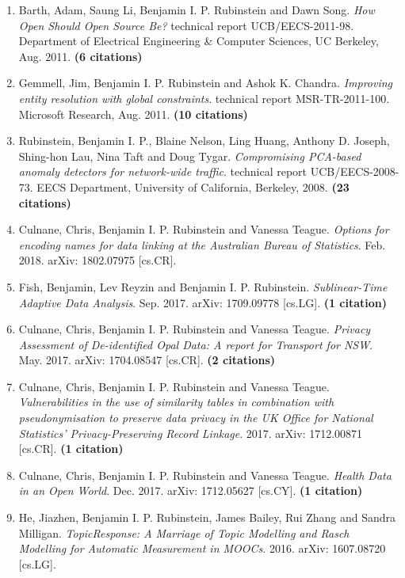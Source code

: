 \documentclass[a4paper,12pt]{article}
\begin{document}
\begin{enumerate}
\setcounter{enumi}{\value{list}}

\item Barth, Adam, Saung Li, Benjamin I. P. Rubinstein and Dawn Song.
\emph{How Open Should Open Source Be?}
technical report UCB/EECS-2011-98.
Department of Electrical Engineering \& Computer Sciences, UC Berkeley, Aug. 2011.
 \textbf{(6 citations)}
\item Gemmell, Jim, Benjamin I. P. Rubinstein and Ashok K. Chandra.
\emph{Improving entity resolution with global constraints}.
technical report MSR-TR-2011-100.
Microsoft Research, Aug. 2011.
 \textbf{(10 citations)}
\item Rubinstein, Benjamin I. P., Blaine Nelson, Ling Huang, Anthony D. Joseph, Shing-hon Lau, Nina Taft and Doug Tygar.
\emph{Compromising PCA-based anomaly detectors for network-wide traffic}.
technical report UCB/EECS-2008-73.
EECS Department, University of California, Berkeley, 2008.
 \textbf{(23 citations)}
\item Culnane, Chris, Benjamin I. P. Rubinstein and Vanessa Teague.
\emph{Options for encoding names for data linking at the Australian Bureau of Statistics}.
Feb. 2018.
arXiv: 1802.07975 [cs.CR].

\item Fish, Benjamin, Lev Reyzin and Benjamin I. P. Rubinstein.
\emph{Sublinear-Time Adaptive Data Analysis}.
Sep. 2017.
arXiv: 1709.09778 [cs.LG].
 \textbf{(1 citation)}
\item Culnane, Chris, Benjamin I. P. Rubinstein and Vanessa Teague.
\emph{Privacy Assessment of De-identified Opal Data: A report for Transport for NSW}.
May. 2017.
arXiv: 1704.08547 [cs.CR].
 \textbf{(2 citations)}
\item Culnane, Chris, Benjamin I. P. Rubinstein and Vanessa Teague.
\emph{Vulnerabilities in the use of similarity tables in combination with pseudonymisation to preserve data privacy in the UK Office for National Statistics' Privacy-Preserving Record Linkage}.
2017.
arXiv: 1712.00871 [cs.CR].
 \textbf{(1 citation)}
\item Culnane, Chris, Benjamin I. P. Rubinstein and Vanessa Teague.
\emph{Health Data in an Open World}.
Dec. 2017.
arXiv: 1712.05627 [cs.CY].
 \textbf{(1 citation)}
\item He, Jiazhen, Benjamin I. P. Rubinstein, James Bailey, Rui Zhang and Sandra Milligan.
\emph{TopicResponse: A Marriage of Topic Modelling and Rasch Modelling for Automatic Measurement in MOOCs}.
2016.
arXiv: 1607.08720 [cs.LG].


\setcounter{list}{\value{enumi}}
\end{enumerate}
\end{document}
